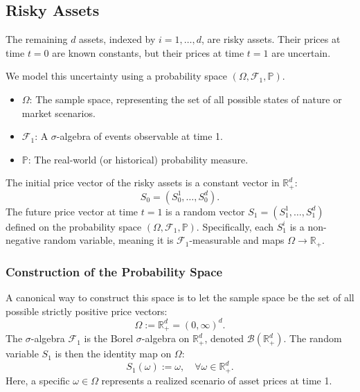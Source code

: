 \subsection{Risky Assets}

The remaining $d$ assets, indexed by $i = 1, \dots, d$, are risky assets. Their prices at time $t=0$ are known constants, but their prices at time $t=1$ are uncertain.

We model this uncertainty using a probability space $(\Omega, \mathcal{F}_1, \mathbb{P})$.
\begin{itemize}
    \item $\Omega$: The sample space, representing the set of all possible states of nature or market scenarios.
    \item $\mathcal{F}_1$: A $\sigma$-algebra of events observable at time 1.
    \item $\mathbb{P}$: The real-world (or historical) probability measure.
\end{itemize}

\begin{definition}
The initial price vector of the risky assets is a constant vector in $\mathbb{R}^d_+$:
\begin{equation}
    S_0 = (S_0^1, \dots, S_0^d).
\end{equation}
The future price vector at time $t=1$ is a random vector $S_1 = (S_1^1, \dots, S_1^d)$ defined on the probability space $(\Omega, \mathcal{F}_1, \mathbb{P})$.
Specifically, each $S_1^i$ is a non-negative random variable, meaning it is $\mathcal{F}_1$-measurable and maps $\Omega \to \mathbb{R}_+$.
\end{definition}

\subsubsection{Construction of the Probability Space}
A canonical way to construct this space is to let the sample space be the set of all possible strictly positive price vectors:
\begin{equation}
    \Omega := \mathbb{R}^d_+ = (0, \infty)^d.
\end{equation}
The $\sigma$-algebra $\mathcal{F}_1$ is the Borel $\sigma$-algebra on $\mathbb{R}^d_+$, denoted $\mathcal{B}(\mathbb{R}^d_+)$.
The random variable $S_1$ is then the identity map on $\Omega$:
\begin{equation}
    S_1(\omega) := \omega, \quad \forall \omega \in \mathbb{R}^d_+.
\end{equation}
Here, a specific $\omega \in \Omega$ represents a realized scenario of asset prices at time 1.

